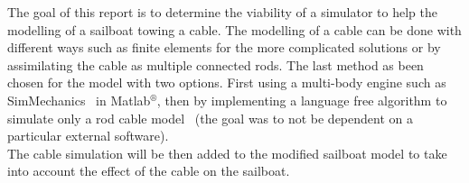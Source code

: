 The goal of this report is to determine the viability of a simulator to help
the modelling of a sailboat towing a cable. The modelling of a cable can be done
with different ways such as finite elements for the more complicated solutions or by assimilating the cable
as multiple connected rods. The last method as been chosen for the model with two options. First using 
a multi-body engine such as SimMechanics\texttrademark~ in Matlab$^{\circledR}$, then by implementing a language free algorithm to simulate
only a rod cable model~\cite{johansen2007modelling} (the goal was to not be dependent on a particular external software).\\
The cable simulation will be then added to the modified sailboat model to take into account the effect of
the cable on the sailboat.